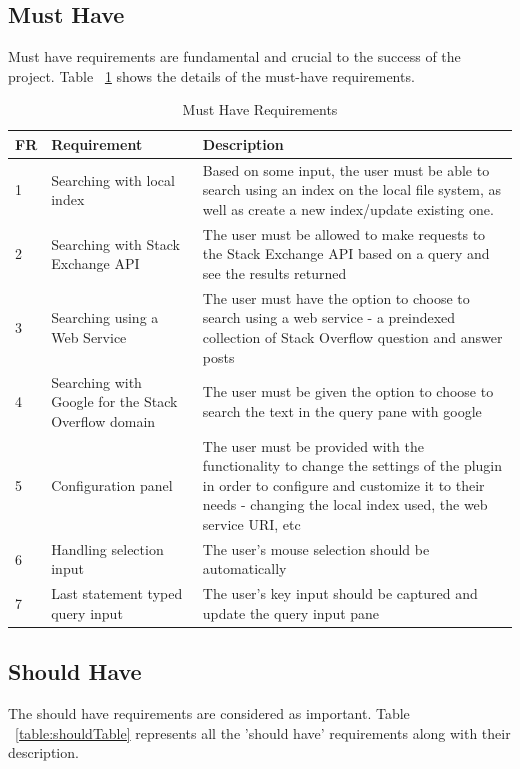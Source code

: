 \documentclass{l4proj}
\begin{document}
\subsection{Must Have}
Must have requirements are fundamental and crucial to the success of the project. Table ~\ref{table:mustTable} shows the details of the must-have requirements.

\begin{table}[h]
\caption{Must Have Requirements}
\centering
\def\arraystretch{1.5}
\begin{tabular}{p{2cm}p{4cm}p{9cm}}
\hline

FR & Requirement & Description \\
\hline
1 & Searching with local index & Based on some input, the user must be able to search using an index on the local file system, as well as create a new index/update existing one.\\
2 & Searching with Stack Exchange API & The user must be allowed to make requests to the Stack Exchange API based on a query and see the results returned\\
3 & Searching using a Web Service & The user must have the option to choose to search using a web service - a preindexed collection of Stack Overflow question and answer posts\\
4 & Searching with Google for the Stack Overflow domain & The user must be given the option to choose to search the text in the query pane with google\\
5 & Configuration panel & The user must be provided with the functionality to change the settings of the plugin in order to configure and customize it to their needs - changing the local index used, the web service URI, etc\\
6 & Handling selection input & The user's mouse selection should be automatically\\
7 & Last statement typed query input & The user's key input should be captured and update the query input pane\\
\hline
\end{tabular}
\label{table:mustTable}
\end{table}

\subsection{Should Have}
The should have requirements are considered as important. Table ~\ref{table:shouldTable} represents all the 'should have' requirements along with their description.
\end{document}
